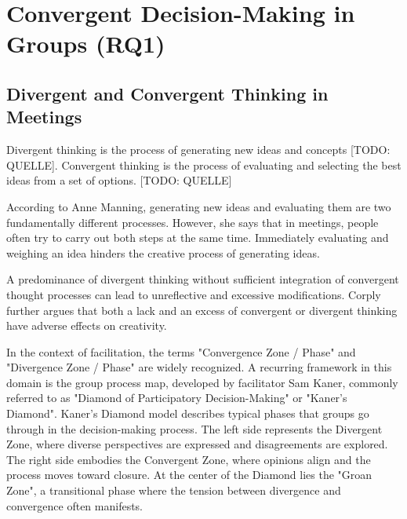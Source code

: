 \section{Convergent Decision-Making in Groups (RQ1)}

\subsection{Divergent and Convergent Thinking in Meetings}
Divergent thinking is the process of generating new ideas and concepts [TODO: QUELLE]. Convergent thinking is
the process of evaluating and selecting the best ideas from a set of options. [TODO: QUELLE]

According to Anne Manning, generating new ideas and evaluating them are two fundamentally different
processes. However, she says that in meetings, people often try to carry out both steps at the same time.
\cite[min 02:30]{professional&executivedevelopment-harvarddceConvergentVsDivergent2024}
Immediately evaluating and weighing an idea hinders the creative process of generating ideas.

A predominance of divergent thinking without sufficient integration of convergent thought processes can lead
to unreflective and excessive modifications. \cite{cropleyPraiseConvergentThinking2006} Corply
\cite{cropleyPraiseConvergentThinking2006} further argues that both a lack and an excess of
convergent or divergent thinking have adverse effects on creativity.

In the context of facilitation, the terms "Convergence Zone / Phase" and "Divergence Zone / Phase" are
widely recognized. A recurring framework in this domain is the group process map, developed by facilitator
Sam Kaner, commonly referred to as "Diamond of Participatory Decision-Making" or "Kaner’s Diamond".
\cite{kanerFacilitatorsGuideParticipatory2014}
Kaner’s Diamond model describes typical phases that groups go through in the decision-making process. The left
side represents the Divergent Zone, where diverse perspectives are expressed and disagreements are explored.
The right side embodies the Convergent Zone, where opinions align and the process moves toward closure. At
the center of the Diamond lies the "Groan Zone", a transitional phase where the tension between divergence
and convergence often manifests.

